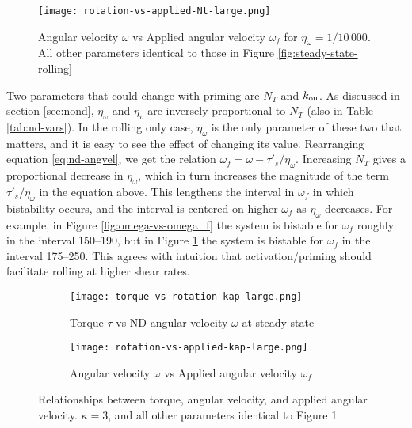 \documentclass{article}
\newcommand{\tn}{\textnormal}
\begin{document}
\begin{figure}
  \centering
  \texttt{[image: rotation-vs-applied-Nt-large.png]}
  \caption{Angular velocity $\omega$ vs Applied angular velocity
    $\omega_f$ for $\eta_\omega = 1/10\, 000$. All other parameters
    identical to those in Figure \ref{fig:steady-state-rolling}}
  \label{fig:rolling-large-Nt}
\end{figure}

Two parameters that could change with priming are $N_T$ and
$k_\tn{on}$. As discussed in section \ref{sec:nond}, $\eta_\omega$ and
$\eta_v$ are inversely proportional to $N_T$ (also in Table
\ref{tab:nd-vars}). In the rolling only case, $\eta_\omega$ is the
only parameter of these two that matters, and it is easy to see the
effect of changing its value. Rearranging equation \eqref{eq:nd-angvel},
we get the relation $\omega_f = \omega -
\tau'_s/\eta_\omega$. Increasing $N_T$ gives a proportional decrease
in $\eta_\omega$, which in turn increases the magnitude of the term
$\tau'_s/\eta_\omega$ in the equation above. This lengthens the
interval in $\omega_f$ in which bistability occurs, and the interval
is centered on higher $\omega_f$ as $\eta_\omega$ decreases. For
example, in Figure \ref{fig:omega-vs-omega_f} the system is bistable
for $\omega_f$ roughly in the interval 150--190, but in Figure
\ref{fig:rolling-large-Nt} the system is bistable for $\omega_f$ in
the interval 175--250. This agrees with intuition that
activation/priming should facilitate rolling at higher shear rates.

\begin{figure}
  \centering
  \begin{subfigure}{0.45\textwidth}
    \texttt{[image: torque-vs-rotation-kap-large.png]}
    \caption{Torque $\tau$ vs ND angular velocity $\omega$ at steady
      state}
    \label{fig:tau-vs-omega-kappa-large}
  \end{subfigure}
  \quad
  \begin{subfigure}{0.45\textwidth}
    \texttt{[image: rotation-vs-applied-kap-large.png]}
    \caption{Angular velocity $\omega$ vs Applied angular velocity
      $\omega_f$} 
    \label{fig:omega-vs-omega_f-kappa-large}
  \end{subfigure}
  \caption{Relationships between torque, angular velocity, and applied
    angular velocity. $\kappa = 3$, and all other parameters identical
    to Figure 1}
  \label{fig:rolling-large-kap}
\end{figure}
\end{document}
